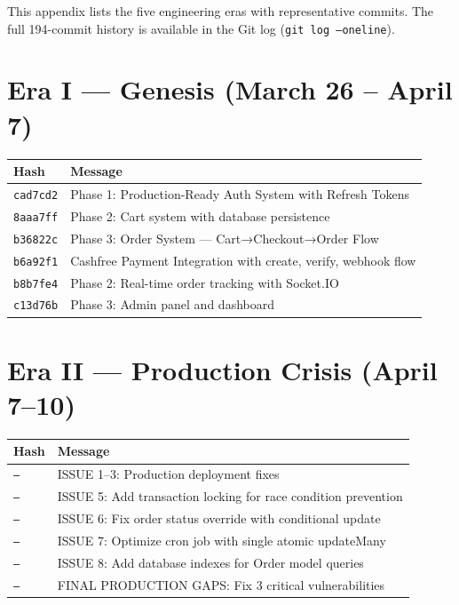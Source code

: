 \documentclass[11pt,a4paper,twoside]{book}
\newcommand{\th}[1]{\textbf{\color{white}#1}}
\begin{document}
This appendix lists the five engineering eras with representative commits.
The full 194-commit history is available in the Git log (\texttt{git log --oneline}).

\section{Era I — Genesis (March 26 – April 7)}

\begin{center}\footnotesize
\begin{longtable}{p{2cm}p{10.5cm}}
\toprule
\rowcolor{headbg}\th{Hash} & \th{Message} \\
\midrule
\texttt{cad7cd2} & Phase 1: Production-Ready Auth System with Refresh Tokens \\
\rowcolor{rowalt}\texttt{8aaa7ff} & Phase 2: Cart system with database persistence \\
\texttt{b36822c} & Phase 3: Order System — Cart→Checkout→Order Flow \\
\rowcolor{rowalt}\texttt{b6a92f1} & Cashfree Payment Integration with create, verify, webhook flow \\
\texttt{b8b7fe4} & Phase 2: Real-time order tracking with Socket.IO \\
\rowcolor{rowalt}\texttt{c13d76b} & Phase 3: Admin panel and dashboard \\
\bottomrule
\end{longtable}
\end{center}

\section{Era II — Production Crisis (April 7–10)}

\begin{center}\footnotesize
\begin{longtable}{p{2cm}p{10.5cm}}
\toprule
\rowcolor{headbg}\th{Hash} & \th{Message} \\
\midrule
\texttt{---} & ISSUE 1–3: Production deployment fixes \\
\rowcolor{rowalt}\texttt{---} & ISSUE 5: Add transaction locking for race condition prevention \\
\texttt{---} & ISSUE 6: Fix order status override with conditional update \\
\rowcolor{rowalt}\texttt{---} & ISSUE 7: Optimize cron job with single atomic updateMany \\
\texttt{---} & ISSUE 8: Add database indexes for Order model queries \\
\rowcolor{rowalt}\texttt{---} & FINAL PRODUCTION GAPS: Fix 3 critical vulnerabilities \\
\bottomrule
\end{longtable}
\end{center}
\end{document}
